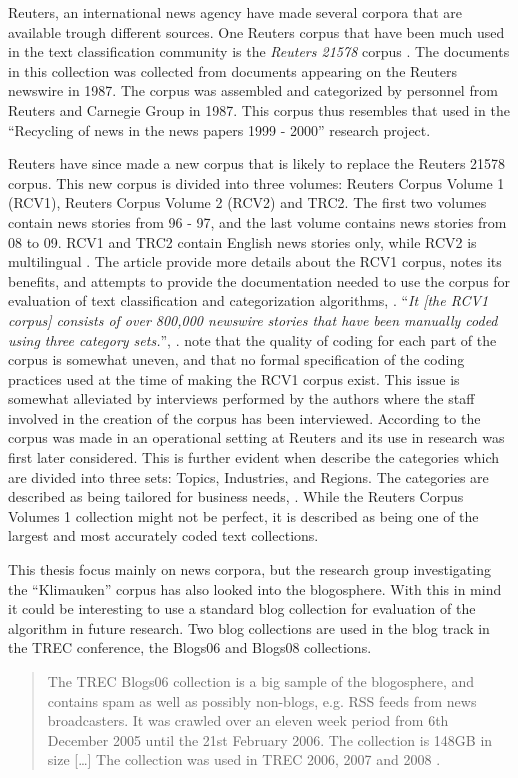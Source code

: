 Reuters, an international news agency have made several corpora that are available trough different sources. One Reuters corpus that have been much used in the text classification community is the \textit{Reuters 21578} corpus \cite{Lewis2004a}. The documents in this collection was collected from documents appearing on the Reuters newswire in 1987. The corpus was assembled and categorized by personnel from Reuters and Carnegie Group in 1987. This corpus thus resembles that used in the ``Recycling of news in the news papers 1999 - 2000'' research project.

Reuters have since made a new corpus that is likely to replace the Reuters 21578 corpus. This new corpus is divided into three volumes: Reuters Corpus Volume 1 (RCV1), Reuters Corpus Volume 2 (RCV2) and TRC2. The first two volumes contain news stories from 96 - 97, and the last volume contains news stories from 08 to 09. RCV1 and TRC2 contain English news stories only, while RCV2 is multilingual \cite{NationalInstituteofStandardsandTechnology2004}. The article  provide more details about the RCV1 corpus, notes its benefits, and attempts to provide the documentation needed to use the corpus for evaluation of text classification and categorization algorithms, \parencite{Lewis2004}. ``\textit{It [the RCV1 corpus] consists of over 800,000 newswire stories that have been manually coded using three category sets.}'', \parencite[][362]{Lewis2004}. \cite{Lewis2004} note that the quality of coding for each part of the corpus is somewhat uneven, and that no formal specification of the coding practices used at the time of making the RCV1 corpus exist. This issue is somewhat alleviated by interviews performed by the authors where the staff involved in the creation of the corpus has been interviewed. According to \cite{Lewis2004} the corpus was made in an operational setting at Reuters and its use in research was first later considered. This is further evident when \cite{Lewis2004} describe the categories which are divided into three sets: Topics, Industries, and Regions. The categories are described as being tailored for business needs, \parencite{Lewis2004}. While the Reuters Corpus Volumes 1 collection might not be perfect, it is described as being one of the largest and most accurately coded text collections.

This thesis focus mainly on news corpora, but the research group investigating the ``Klimauken'' corpus has also looked into the blogosphere. With this in mind it could be interesting to use a standard blog collection for evaluation of the algorithm in future research. Two blog collections are used in the blog track in the TREC conference, the Blogs06 and Blogs08 collections.\begin{quote}
The TREC Blogs06 collection is a big sample of the blogosphere, and contains spam as well as possibly non-blogs, e.g. RSS feeds from news broadcasters. It was crawled over an eleven week period from 6th December 2005 until the 21st February 2006. The collection is 148GB in size [\dots] The collection was used in TREC 2006, 2007 and 2008 \cite{Macdonald2011}.
\end{quote} 

